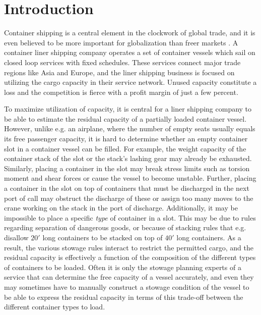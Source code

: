 
\usepackage{longtable}
\allowdisplaybreaks


  
\maketitle

\section{Introduction}
Container shipping is a central element in the clockwork of global trade, and it is even believed to be more important for globalization than freer markets \cite{EC13}. A container liner shipping company operates a set of container vessels which sail on closed loop services with fixed schedules. These services connect major trade regions like Asia and Europe, and the liner shipping business is focused on utilizing the cargo capacity in their service network. Unused capacity constitute a loss and the competition is fierce with a profit margin of just a few percent.  

To maximize utilization of capacity, it is central for a liner shipping company to be able to estimate the residual capacity of a partially loaded container vessel. However, unlike e.g. an airplane, where the number of empty seats usually equals its free passenger capacity, it is hard to determine whether an empty container slot in a container vessel can be filled.   
For example, the weight capacity of the container stack of the slot or the stack's lashing gear may already be exhausted. 
Similarly, placing a container in the slot may break stress limits such as torsion moment and shear forces or cause the vessel to become unstable.
Further, placing a container in the slot on top of containers that must be discharged in the next port of call may obstruct the discharge of these or assign too many moves to the crane working on the stack in the port of discharge. 
Additionally,  
it may be impossible to place a specific \emph{type} of container in a slot. This may be due to rules regarding separation of dangerous goods, or because of stacking rules that e.g. disallow $20'$ long containers to be stacked on top of $40'$ long containers. 
As a result, the various stowage rules interact to restrict the permitted cargo, and the residual capacity is  effectively a function of the composition of the different types of containers to be loaded.
Often it is only the stowage planning experts of a service that can determine the free capacity of a vessel accurately, and even they may sometimes have to manually construct a stowage condition of the vessel to be able to express the residual capacity in terms of this trade-off between the different container types to load.


